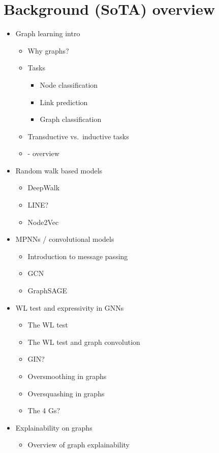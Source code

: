 \chapter{Background (SoTA) overview}
\label{chap:sota}

\begin{itemize}
	\item Graph learning intro
		\begin{itemize}
			\item Why graphs?
			\item Tasks
				\begin{itemize}
					\item Node classification
					\item Link prediction
					\item Graph classification
				\end{itemize}
			\item Transductive vs.\ inductive tasks
			\item \cite{gori_new_2005} - overview
		\end{itemize}
	\item Random walk based models
		\begin{itemize}
			\item DeepWalk
			\item LINE?
			\item Node2Vec
		\end{itemize}
	\item MPNNs / convolutional models
		\begin{itemize}
			\item Introduction to message passing
			\item GCN
			\item GraphSAGE
		\end{itemize}
	\item WL test and expressivity in GNNs
		\begin{itemize}
			\item The WL test
			\item The WL test and graph convolution
			\item GIN?
			\item Oversmoothing in graphs
			\item Oversquashing in graphs
			\item The 4 Gs?
		\end{itemize}
	\item Explainability on graphs
		\begin{itemize}
			\item Overview of graph explainability

\end{itemize}
\end{itemize}
